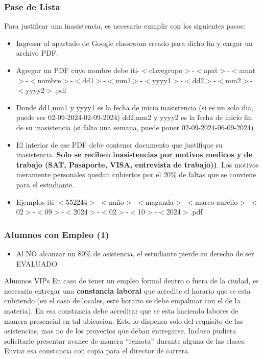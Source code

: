 \begin{frame}
\frametitle{Pase de Lista}
Para justificar una inasistencia, es necesario cumplir con los siguientes pasos:
\begin{itemize}	 
\item Ingresar al apartado de Google classroom creado para dicho fin y cargar un archivo PDF. 
\item Agregar un PDF cuyo nombre debe 
\tiny
iti-$<$clavegrupo$>$-$<$apat$>$-$<$amat$>$-$<$nombre$>$-$<$dd1$>$-$<$mm1$>$-$<$yyyy1$>$-$<$dd2$>$-$<$mm2$>$-$<$yyyy2$>$.pdf
\item Donde dd1,mm1 y yyyy1 es la fecha de inicio inasistencia (si es un solo dia, puede ser 02-09-2024-02-09-2024)
dd2,mm2 y yyyy2 es la fecha de inicio fin de su inasistencia (si falto una semana, puede poner 02-09-2024-06-09-2024)
\item El interior de ese PDF debe contener documento que justifique su inasistencia. \textbf{Solo se reciben inasistencias por motivos medicos y de trabajo (SAT, Pasaporte, VISA, entrevista de trabajo))}. Los motivos meramente personales quedan cubiertos por el 20\% de faltas que se conviene para el estudiante.  
\item Ejemplos
\tiny
iti-$<$552244$>$-$<$nuño$>$-$<$maganda$>$-$<$marco-aurelio$>$-$<$02$>$-$<$09$>$-$<$2024$>$-$<$02$>$-$<$10$>$-$<$2024$>$.pdf
\end{itemize}
\end{frame}


\begin{frame}
\frametitle{Alumnos con Empleo (1)}
\begin{itemize}
\item Al NO alcanzar un 80\% de asistencia, el estudiante pierde su derecho de ser EVALUADO
\end{itemize}
\begin{block}{Alumnos VIPs}
En caso de tener un empleo formal dentro o fuera de la ciudad, es necesario entregar una \textbf{constancia laboral} que acredite el horario que se esta cubriendo (en el caso de locales, este horario se debe empalmar con el de la materia). En esa constancia debe acreditar que se esta haciendo labores de manera presencial en tal ubicacion. Esto lo dispensa solo del requisito de las asistencias, mas no de los proyectos que deban entregarse. Incluso pudiera solicitarle presentar avance de manera ``remota'' durante alguna de las clases. Enviar esa constancia con copia para el director de carrera.
\end{block}
\end{frame}


